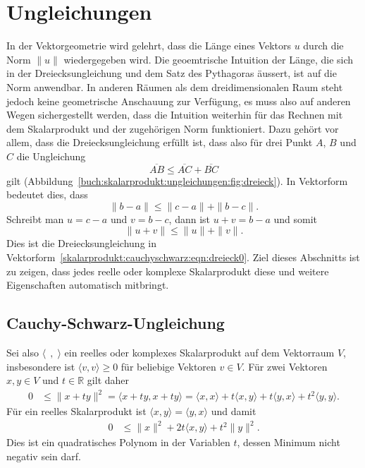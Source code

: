 %
%
%
\section{Ungleichungen
\label{buch:skalarprodukte:section:cauchyschwarz}}

In der Vektorgeometrie wird gelehrt, dass die Länge eines Vektors $u$
durch die Norm $\|u\|$ wiedergegeben wird.
Die geoemtrische Intuition der Länge, die sich in der Dreiecksungleichung
%
%
%
und dem Satz des Pythagoras äussert, ist auf die Norm anwendbar.
In anderen Räumen als dem dreidimensionalen Raum steht
jedoch keine geometrische Anschauung zur Verfügung, es muss also
auf anderen Wegen sichergestellt werden, dass die Intuition weiterhin
für das Rechnen mit dem Skalarprodukt und der zugehörigen Norm
funktioniert.
Dazu gehört vor allem, dass die Dreiecksungleichung erfüllt ist,
dass also für drei Punkt $A$, $B$ und $C$ die Ungleichung
\begin{equation}
\overline{AB} \le \overline{AC} + \overline{BC}
\label{skalarprodukt:ungleichungen:eqn:dreieck}
\end{equation}
gilt (Abbildung~\ref{buch:skalarprodukt:ungleichungen:fig:dreieck}).
In Vektorform bedeutet dies, dass
\[
\| b-a\|
\le
\| c-a\| + \|b-c\|.
\]
Schreibt man $u=c-a$ und $v=b-c$, dann ist $u+v=b-a$ und somit
\begin{equation}
\| u+v\| \le \|u\| + \|v\|.
\label{skalarprodukt:cauchyschwarz:eqn:dreieck0}
\end{equation}
Dies ist die Dreiecksungleichung in
Vektorform~\eqref{skalarprodukt:cauchyschwarz:eqn:dreieck0}.
Ziel dieses Abschnitts ist zu zeigen, dass jedes reelle oder
komplexe Skalarprodukt diese und weitere Eigenschaften automatisch
mitbringt.

%
%
\subsection{Cauchy-Schwarz-Ungleichung}
Sei also $\langle\;\,,\;\rangle$ ein reelles oder komplexes Skalarprodukt
auf dem Vektorraum $V$,
insbesondere ist $\langle v,v\rangle\ge 0$ für beliebige Vektoren $v\in V$.
Für zwei Vektoren $x,y\in V$ und $t\in \mathbb{R}$  gilt daher
\begin{align}
0
&\le
\| x+ty\|^2
=
\langle x+ty,x+ty\rangle
=
\langle x,x\rangle
+
t\langle x,y\rangle
+
t\langle y,x\rangle
+
t^2
\langle y,y\rangle.
\label{skalarprodukt:cauchyschwarz:eqn:quadrat}
\end{align}
Für ein reelles Skalarprodukt ist $\langle x,y\rangle=\langle y,x\rangle$
und damit
\begin{align}
0
&\le
\|x\|^2 + 2t\langle x,y\rangle + t^2 \|y\|^2.
\label{buch:skalarprodukt:cauchyschwarz:eqn:cspoly}
\end{align}
Dies ist ein quadratisches Polynom in der Variablen $t$, dessen Minimum
nicht negativ sein darf.

